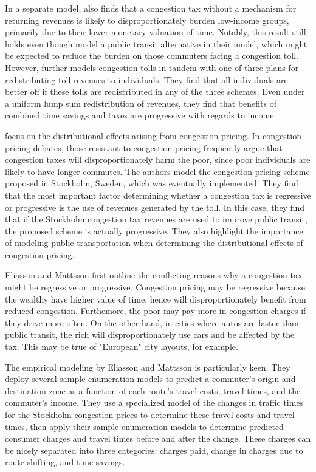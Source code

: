 \documentclass[JEL]{AEA}
\begin{document}
In a separate model, \cite{small-1983} also finds that a congestion tax without a mechanism for returning revenues is likely to disproportionately burden low-income groups, primarily due to their lower monetary valuation of time. Notably, this result still holds even though \cite{small-1983} model a public transit alternative in their model, which might be expected to reduce the burden on those commuters facing a congestion toll. However, \cite{small-1983} further models congestion tolls in tandem with one of three plans for redistributing toll revenues to individuals. They find that all individuals are better off if these tolls are redistributed in any of the three schemes. Even under a uniform lump sum redistribution of revenues, they find that benefits of combined time savings and taxes are progressive with regards to income.

\cite{eliasson-2006} focus on the distributional effects arising from congestion pricing. In congestion pricing debates, those resistant to congestion pricing frequently argue that congestion taxes will disproportionately harm the poor, since poor individuals are likely to have longer commutes. The authors model the congestion pricing scheme proposed in Stockholm, Sweden, which was eventually implemented. They find that the most important factor determining whether a congestion tax is regressive or progressive is the use of revenues generated by the toll. In this case, they find that if the Stockholm congestion tax revenues are used to improve public transit, the proposed scheme is actually progressive. They also highlight the importance of modeling public transportation when determining the distributional effects of congestion pricing.

Eliasson and Mattsson first outline the conflicting reasons why a congestion tax might be regressive or progressive. Congestion pricing may be regressive because the wealthy have higher value of time, hence will disproportionately benefit from reduced congestion. Furthemore, the poor may pay more in congestion charges if they drive more often. On the other hand, in cities where autos are faster than public transit, the rich will disproportionately use cars and be affected by the tax. This may be true of "European" city layouts, for example.

The empirical modeling by Eliasson and Mattsson is particularly keen. They deploy several sample enumeration models to predict a commuter's origin and destination zone as a function of each route's travel costs, travel times, and the commuter's income. They use a specialized model of the changes in traffic times for the Stockholm congestion prices to determine these travel costs and travel times, then apply their sample enumeration models to determine predicted consumer charges and travel times before and after the change. These charges can be nicely separated into three categories: charges paid, change in charges due to route shifting, and time savings.
\end{document}
